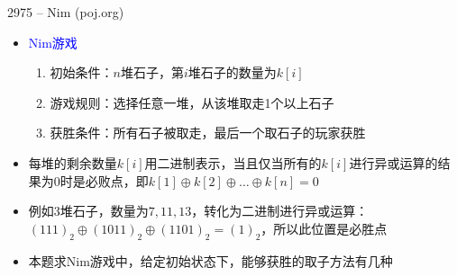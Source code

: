 \begin{frame}{2975 -- Nim (poj.org)}
    \begin{itemize}
        \item \textcolor{blue}{Nim游戏}
        \begin{enumerate}[(1)]
            \item 初始条件：$n$堆石子，第$i$堆石子的数量为$k[i]$
            \item 游戏规则：选择任意一堆，从该堆取走1个以上石子
            \item 获胜条件：所有石子被取走，最后一个取石子的玩家获胜
        \end{enumerate}
        \item 每堆的剩余数量$k[i]$用二进制表示，当且仅当所有的$k[i]$进行异或运算的结果为0时是必败点，即$k[1]⊕k[2]⊕\ldots ⊕k[n]=0$
        \item 例如3堆石子，数量为$7,11,13$，转化为二进制进行异或运算：$(111)_2⊕(1011)_2⊕(1101)_2=(1)_2$，所以此位置是必胜点
        \item 本题求Nim游戏中，给定初始状态下，能够获胜的取子方法有几种   
    \end{itemize}
\end{frame}
